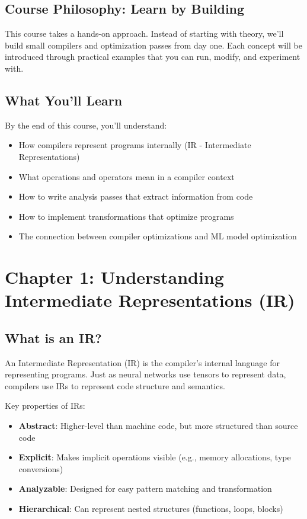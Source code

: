 \documentclass[11pt,a4paper]{article}
\begin{document}
\subsection{Course Philosophy: Learn by Building}

This course takes a hands-on approach. Instead of starting with theory, we'll build small compilers and optimization passes from day one. Each concept will be introduced through practical examples that you can run, modify, and experiment with.

\subsection{What You'll Learn}

By the end of this course, you'll understand:
\begin{itemize}
    \item How compilers represent programs internally (IR - Intermediate Representations)
    \item What operations and operators mean in a compiler context
    \item How to write analysis passes that extract information from code
    \item How to implement transformations that optimize programs
    \item The connection between compiler optimizations and ML model optimization
\end{itemize}

\section{Chapter 1: Understanding Intermediate Representations (IR)}

\subsection{What is an IR?}

An Intermediate Representation (IR) is the compiler's internal language for representing programs. Just as neural networks use tensors to represent data, compilers use IRs to represent code structure and semantics.

Key properties of IRs:
\begin{itemize}
    \item \textbf{Abstract}: Higher-level than machine code, but more structured than source code
    \item \textbf{Explicit}: Makes implicit operations visible (e.g., memory allocations, type conversions)
    \item \textbf{Analyzable}: Designed for easy pattern matching and transformation
    \item \textbf{Hierarchical}: Can represent nested structures (functions, loops, blocks)
\end{itemize}
\end{document}

